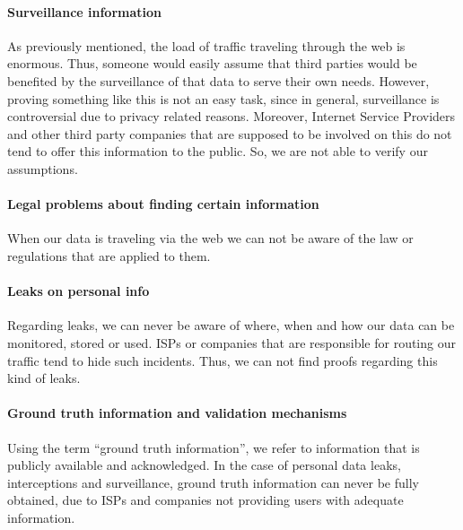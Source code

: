 \paragraph{Surveillance information\\}
As previously mentioned, the load of traffic traveling through the web is 
enormous. Thus, someone would easily assume that third parties would be 
benefited by the surveillance of that data to serve their own needs. However, 
proving something like this is not an easy task, since in general, surveillance 
is controversial due to privacy related reasons. Moreover, Internet Service 
Providers and other third party companies that are supposed to be involved on 
this do not tend to offer this information to the public. So, we are not able to 
verify our assumptions.  

\paragraph{Legal problems about finding certain information\\}
When our data is traveling via the web we can not be aware of the law or 
regulations that are applied to them. 

\paragraph{Leaks on personal info\\}
Regarding leaks, we can never be aware of where, when and how our data can be 
monitored, stored or used. ISPs or companies that are responsible for routing 
our traffic tend to hide such incidents. Thus, we can not find proofs regarding 
this kind of leaks. 

\paragraph{Ground truth information and validation mechanisms\\}
Using the term ``ground truth information'', we refer to information that is 
publicly available and acknowledged. In the case of personal data leaks, 
interceptions and surveillance, ground truth information can never be fully 
obtained, due to ISPs and companies not providing users with adequate 
information. 

